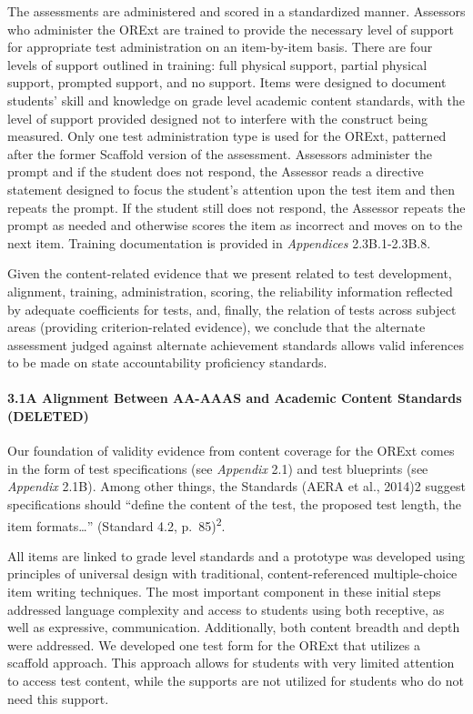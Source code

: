 \documentclass[]{article}
\let\oldparagraph\paragraph
\renewcommand{\paragraph}[1]{\oldparagraph{#1}\mbox{}}
\begin{document}
The assessments are administered and scored in a standardized manner.
Assessors who administer the ORExt are trained to provide the necessary
level of support for appropriate test administration on an item-by-item
basis. There are four levels of support outlined in training: full
physical support, partial physical support, prompted support, and no
support. Items were designed to document students' skill and knowledge
on grade level academic content standards, with the level of support
provided designed not to interfere with the construct being measured.
Only one test administration type is used for the ORExt, patterned after
the former Scaffold version of the assessment. Assessors administer the
prompt and if the student does not respond, the Assessor reads a
directive statement designed to focus the student's attention upon the
test item and then repeats the prompt. If the student still does not
respond, the Assessor repeats the prompt as needed and otherwise scores
the item as incorrect and moves on to the next item. Training
documentation is provided in \emph{Appendices} 2.3B.1-2.3B.8.

Given the content-related evidence that we present related to test
development, alignment, training, administration, scoring, the
reliability information reflected by adequate coefficients for tests,
and, finally, the relation of tests across subject areas (providing
criterion-related evidence), we conclude that the alternate assessment
judged against alternate achievement standards allows valid inferences
to be made on state accountability proficiency standards.

\paragraph{3.1A Alignment Between AA-AAAS and Academic Content Standards
(DELETED)}\label{a-alignment-between-aa-aaas-and-academic-content-standards-deleted}

Our foundation of validity evidence from content coverage for the ORExt
comes in the form of test specifications (see \emph{Appendix} 2.1) and
test blueprints (see \emph{Appendix} 2.1B). Among other things, the
Standards (AERA et al., 2014)2 suggest specifications should ``define
the content of the test, the proposed test length, the item
formats\ldots{}'' (Standard 4.2, p.~85)\textsuperscript{2}.

All items are linked to grade level standards and a prototype was
developed using principles of universal design with traditional,
content-referenced multiple-choice item writing techniques. The most
important component in these initial steps addressed language complexity
and access to students using both receptive, as well as expressive,
communication. Additionally, both content breadth and depth were
addressed. We developed one test form for the ORExt that utilizes a
scaffold approach. This approach allows for students with very limited
attention to access test content, while the supports are not utilized
for students who do not need this support.
\end{document}
